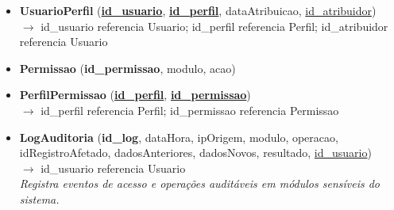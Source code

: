 \begin{itemize}[itemsep=10pt]
    \item \textbf{UsuarioPerfil} (\textbf{\underline{id\_usuario}}, \textbf{\underline{id\_perfil}}, dataAtribuicao, \underline{id\_atribuidor})
    \\{\small $\rightarrow$ id\_usuario referencia Usuario; id\_perfil referencia Perfil; id\_atribuidor referencia Usuario}

    \item \textbf{Permissao} (\textbf{id\_permissao}, modulo, acao)

    \item \textbf{PerfilPermissao} (\textbf{\underline{id\_perfil}}, \textbf{\underline{id\_permissao}})
    \\{\small $\rightarrow$ id\_perfil referencia Perfil; id\_permissao referencia Permissao}

    \item \textbf{LogAuditoria} (\textbf{id\_log}, dataHora, ipOrigem, modulo, operacao, idRegistroAfetado, dadosAnteriores, dadosNovos, resultado, \underline{id\_usuario})
    \\{\small $\rightarrow$ id\_usuario referencia Usuario}
    \\{\small \textit{Registra eventos de acesso e operações auditáveis em módulos sensíveis do sistema.}}

\end{itemize}

